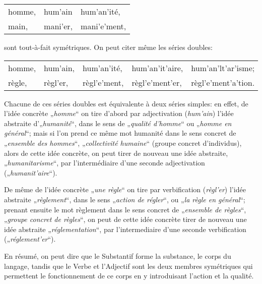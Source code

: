 {     {\centering
      \begin{tabular}[t]{lll}
        \textup{homme}, &\textup{hum'ain} &\textup{hum’an’ité,}\\
        \textup{main}, &\textup{mani'er}, &\textup{mani'e'ment},
      \end{tabular}
      \par}\vspace*{1ex}
    
    \noindent
    sont tout-à-fait symétriques. On peut citer même les séries
    doubles:

    {\centering
      \begin{tabular}[t]{lllll}
        \textup{homme},& \textup{hum'ain},& \textup{hum'an’ité},&
                                                                  \textup{hum'an’it'aire},&
                                                                                            \textup{hum'an'lt'ar'isme};\\        
        \textup{règle}, &\textup{règl'er}, &\textup{règl'e'ment},&
                                                                   \textup{règl'e'ment'er},&
                                                                                             \textup{règl'e'ment'a'tion}.  
      \end{tabular}
      \par}\vspace*{1ex}


    Chacune de ces séries doubles est équivalente à deux séries\largerpage
    simples: en effet, de l’idée concrète „\emph{homme}“ on tire
    d’abord par adjectivation (\emph{hum'ain}) l’idée abstraite
    d'„\emph{humani\-té}“, dans le sens de „\emph{qualité d'homme}“ ou
    „\emph{homme en général}“; mais si l’on prend ce même mot
    \textup{humanité} dans le sens concret de „\emph{ensemble des
      hommes}“, „\emph{collectivité humaine}“ (groupe concret
    d’individus), alors de cette idée concrète, on peut tirer de
    nouveau une idée abstraite, „\emph{humanitarisme}“, par
    l’intermédiaire d’une seconde adjectivation
    („\emph{humanit'aire}“).

    De même de l’idée concrète „\emph{une règle}“ on tire par
    verbification (\emph{règl'er}) l’idée abstraite
    „\emph{règlement}“, dans le sens „\emph{action de régler}“, ou
    „\emph{la règle en général}“; prenant ensuite le mot
    \textup{règlement} dans le sens concret de „\emph{ensemble de
      règles}“, „\emph{groupe concret de règles}“, on peut de cette
    idée concrète tirer de nouveau une idée abstraite
    „\emph{réglementation}“, par l’intermediaire d’une seconde
    verbification („\emph{réglement'er}“).

    En résumé, on peut dire que le Substantif forme la substance, le
    corps du langage, tandis que le Verbe et l’Adjectif sont les deux
    membres symétriques qui permettent le fonctionnement de ce corps
    en y introduisant l’action et la qualité.
  }
  
